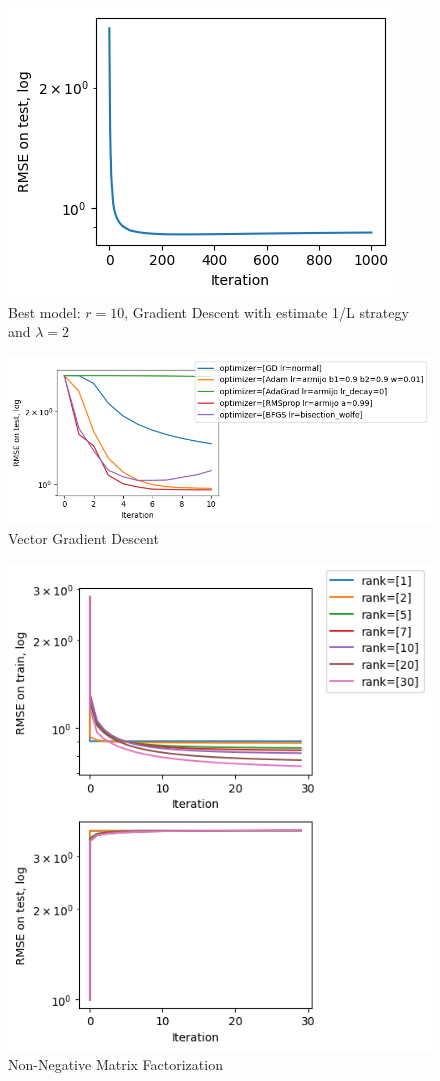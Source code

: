 \documentclass{article}
\begin{document}
\begin{figure}[H]
  \centering
  \includegraphics[keepaspectratio]{../data/final.png}
  \caption[Best model]{Best model: $r=10$, Gradient Descent with estimate 1/L strategy and $\lambda=2$}\label{fig:best}
\end{figure}

\begin{figure}[H]
  \centering
  \includegraphics[width=\textwidth,keepaspectratio]{../data/vector_gd.png}
  \caption[Vector GD]{Vector Gradient Descent}\label{fig:vector_gd}
\end{figure}

\begin{figure}[H]
  \centering
  \includegraphics[keepaspectratio, scale=0.7]{../data/nnmf.png}
  \caption[NNMF]{Non-Negative Matrix Factorization}\label{fig:nnmf}
\end{figure}
\end{document}
